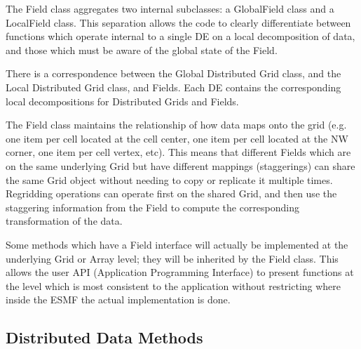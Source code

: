 



The Field class aggregates two internal subclasses: a GlobalField class
and a LocalField class.  This separation allows the code to clearly
differentiate between functions which operate internal to a single DE
on a local decomposition of data, 
and those which must be aware of the
global state of the Field.  
 
There is a correspondence between the Global Distributed Grid class,
and the Local Distributed Grid class, and Fields.  Each DE contains
the corresponding local decompositions for Distributed Grids and Fields.

The Field class maintains the relationship of
how data maps onto the grid (e.g. one item per cell located at
the cell center, one item per cell located at the NW corner, 
one item per cell vertex, etc).  This means that different Fields
which are on the same underlying Grid but have different
mappings (staggerings) can share the same Grid object without
needing to copy or replicate it multiple times.  Regridding
operations can operate first on the shared Grid, and then
use the staggering information from the Field to compute the
corresponding transformation of the data.

Some methods which have a Field interface will actually be
implemented at the underlying Grid or Array level; they
will be inherited by the Field class.  This allows the user
API (Application Programming Interface) to present functions at
the level which is most consistent to the application without
restricting where inside the ESMF the actual implementation
is done.



\subsection{Distributed Data Methods}

